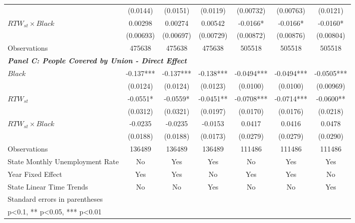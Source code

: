 \begin{table}[ht!]
\begin{tabular}{l*{6}{c}}
&    (0.0144)   &    (0.0151)   &    (0.0119)   &   (0.00732)   &   (0.00763)   &    (0.0121)   \\
[1em]
$ RTW_{st} \times Black $&     0.00298   &     0.00274   &     0.00542   &     -0.0166*  &     -0.0166*  &     -0.0160*  \\
&   (0.00693)   &   (0.00697)   &   (0.00729)   &   (0.00872)   &   (0.00876)   &   (0.00804)   \\
\hline
Observations        &      475638   &      475638   &      475638   &      505518   &      505518   &      505518   \\
\hline
\multicolumn{3}{l}{\linebreak \textbf{\textit{Panel C: People Covered by Union - Direct Effect}}} \\
$ Black $           &      -0.137***&      -0.137***&      -0.138***&     -0.0494***&     -0.0494***&     -0.0505***\\
&    (0.0124)   &    (0.0124)   &    (0.0123)   &    (0.0100)   &    (0.0100)   &   (0.00969)   \\
[1em]
$ RTW_{st} $      &     -0.0551*  &     -0.0559*  &     -0.0451** &     -0.0708***&     -0.0714***&     -0.0600** \\
&    (0.0312)   &    (0.0321)   &    (0.0197)   &    (0.0170)   &    (0.0176)   &    (0.0218)   \\
[1em]
$ RTW_{st} \times Black $&     -0.0235   &     -0.0235   &     -0.0153   &      0.0417   &      0.0416   &      0.0478   \\
&    (0.0188)   &    (0.0188)   &    (0.0173)   &    (0.0279)   &    (0.0279)   &    (0.0290)   \\
\hline
Observations        &      136489   &      136489   &      136489   &      111486   &      111486   &      111486   \\
State Monthly Unemployment Rate&          No   &         Yes   &         Yes   &          No   &         Yes   &         Yes   \\
Year Fixed Effect   &         Yes   &         Yes   &          No   &         Yes   &         Yes   &          No   \\
State Linear Time Trends&          No   &          No   &         Yes   &          No   &          No   &         Yes   \\
\hline\hline
\multicolumn{7}{l}{\footnotesize Standard errors in parentheses}\\
\multicolumn{7}{l}{\footnotesize * p<0.1, ** p<0.05, *** p<0.01}\\
\end{tabular}
\end{table}
